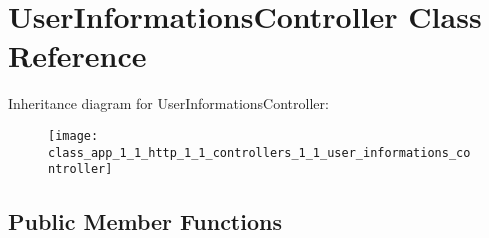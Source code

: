\hypertarget{class_app_1_1_http_1_1_controllers_1_1_user_informations_controller}{}\section{User\+Informations\+Controller Class Reference}
\label{class_app_1_1_http_1_1_controllers_1_1_user_informations_controller}
Inheritance diagram for User\+Informations\+Controller\+:\begin{figure}[H]
\begin{center}
\leavevmode
\texttt{[image: class\_app\_1\_1\_http\_1\_1\_controllers\_1\_1\_user\_informations\_controller]}
\end{center}
\end{figure}
\subsection*{Public Member Functions}
